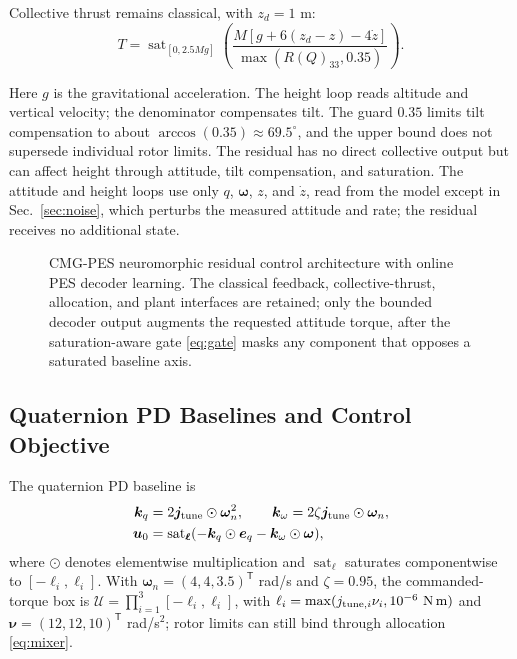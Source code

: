 \documentclass[letterpaper, 10 pt, conference]{ieeeconf}
\newcommand{\T}{^{\mathsf T}}
\newcommand{\sat}{\operatorname{sat}}
\begin{document}
Collective thrust remains classical, with $z_d=1$ m:
\begin{equation}
 T=\sat_{[0,2.5Mg]}
 \left(\frac{M[g+6(z_d-z)-4\dot z]}{\max(R(Q)_{33},0.35)}\right).
 \label{eq:collective}
\end{equation}

Here $g$ is the gravitational acceleration. The height loop reads altitude and vertical velocity; the denominator compensates tilt. The guard $0.35$ limits tilt compensation to about $\arccos(0.35)\approx69.5^\circ$, and the upper bound does not supersede individual rotor limits. The residual has no direct collective output but can affect height through attitude, tilt compensation, and saturation. The attitude and height loops use only $q$, $\bm\omega$, $z$, and $\dot z$, read from the model except in Sec.~\ref{sec:noise}, which perturbs the measured attitude and rate; the residual receives no additional state.

\begin{figure}[!th]
    \centering
    \resizebox{0.84\textwidth}{!}{}
    \caption{CMG-PES neuromorphic residual control architecture with online PES decoder learning. The classical feedback, collective-thrust, allocation, and plant interfaces are retained; only the bounded decoder output augments the requested attitude torque, after the saturation-aware gate \eqref{eq:gate} masks any component that opposes a saturated baseline axis.}
    \label{fig:arch}
\end{figure}

\subsection{Quaternion PD Baselines and Control Objective}

The quaternion PD baseline is
\begin{align}
 \bm k_q&=2\bm j_{\rm tune}\odot\bm\omega_n^2,\qquad
 \bm k_\omega=2\zeta\bm j_{\rm tune}\odot\bm\omega_n,\\
 \bm u_0&=\sat_{\bm\ell}(-\bm k_q\odot\bm e_q-\bm k_\omega\odot\bm\omega),
 \label{eq:pd}
\end{align}
where $\odot$ denotes elementwise multiplication and $\sat_{\bm\ell}$ saturates componentwise to $[-\ell_i,\ell_i]$. With $\bm\omega_n=(4,4,3.5)\T$ rad/s and $\zeta=0.95$, the commanded-torque box is $\mathcal U=\prod_{i=1}^3[-\ell_i,\ell_i]$, with $\ell_i=\max(j_{{\rm tune},i}\nu_i,10^{-6}\ \mathrm{N\,m})$ and $\bm\nu=(12,12,10)\T$ rad/s$^2$; rotor limits can still bind through allocation \eqref{eq:mixer}.
\end{document}
